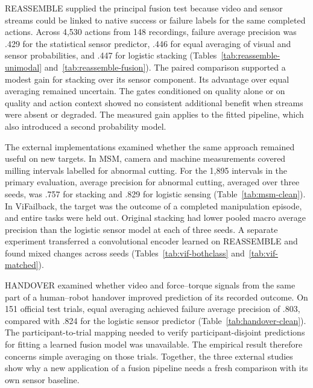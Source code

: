 REASSEMBLE supplied the principal fusion test because video and sensor streams could be linked to native success or failure labels for the same completed actions. Across 4,530 actions from 148 recordings, failure average precision was .429 for the statistical sensor predictor, .446 for equal averaging of visual and sensor probabilities, and .447 for logistic stacking (Tables~\ref{tab:reassemble-unimodal} and~\ref{tab:reassemble-fusion}). The paired comparison supported a modest gain for stacking over its sensor component. Its advantage over equal averaging remained uncertain. The gates conditioned on quality alone or on quality and action context showed no consistent additional benefit when streams were absent or degraded. The measured gain applies to the fitted pipeline, which also introduced a second probability model.

The external implementations examined whether the same approach remained useful on new targets. In MSM, camera and machine measurements covered milling intervals labelled for abnormal cutting. For the 1,895 intervals in the primary evaluation, average precision for abnormal cutting, averaged over three seeds, was .757 for stacking and .829 for logistic sensing (Table~\ref{tab:msm-clean}). In ViFailback, the target was the outcome of a completed manipulation episode, and entire tasks were held out. Original stacking had lower pooled macro average precision than the logistic sensor model at each of three seeds. A separate experiment transferred a convolutional encoder learned on REASSEMBLE and found mixed changes across seeds (Tables~\ref{tab:vif-bothclass} and~\ref{tab:vif-matched}).

HANDOVER examined whether video and force--torque signals from the same part of a human--robot handover improved prediction of its recorded outcome. On 151 official test trials, equal averaging achieved failure average precision of .803, compared with .824 for the logistic sensor predictor (Table~\ref{tab:handover-clean}). The participant-to-trial mapping needed to verify participant-disjoint predictions for fitting a learned fusion model was unavailable. The empirical result therefore concerns simple averaging on those trials. Together, the three external studies show why a new application of a fusion pipeline needs a fresh comparison with its own sensor baseline.

